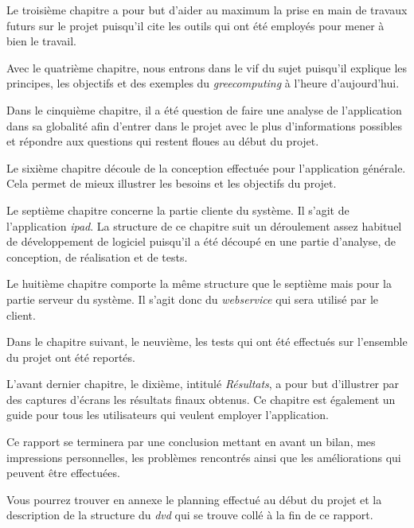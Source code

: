 \medskip

Le troisième chapitre a pour but d'aider au maximum la prise en main de travaux futurs sur le projet puisqu'il cite les outils qui ont été employés pour mener à bien le travail.

\medskip

Avec le quatrième chapitre, nous entrons dans le vif du sujet puisqu'il explique les principes, les objectifs et des exemples du \emph{\gls{greecomputing}} à l'heure d'aujourd'hui.

\medskip

Dans le cinquième chapitre, il a été question de faire une analyse de l'application dans sa globalité afin d'entrer dans le projet avec le plus d'informations possibles et répondre aux questions qui restent floues au début du projet. 

\medskip

Le sixième chapitre découle de la conception effectuée pour l'application générale. Cela permet de mieux illustrer les besoins et les objectifs du projet.

\medskip

Le septième chapitre concerne la partie cliente du système. Il s'agit de l'application \emph{\gls{ipad}}. La structure de ce chapitre suit un déroulement assez habituel de développement de logiciel puisqu'il a été découpé en une partie d'analyse, de conception, de réalisation et de tests.

\medskip

Le huitième chapitre comporte la même structure que le septième mais pour la partie serveur du système. Il s'agit donc du \emph{\gls{webservice}} qui sera utilisé par le client.

\medskip 

Dans le chapitre suivant, le neuvième, les tests qui ont été effectués sur l'ensemble du projet ont été reportés.

\medskip

L'avant dernier chapitre, le dixième, intitulé \emph{Résultats}, a pour but d'illustrer par des captures d'écrans les résultats finaux obtenus. Ce chapitre est également un guide pour tous les utilisateurs qui veulent employer l'application.

\medskip

Ce rapport se terminera par une conclusion mettant en avant un bilan, mes impressions personnelles, les problèmes rencontrés ainsi que les améliorations qui peuvent être effectuées.

\medskip

Vous pourrez trouver en annexe le planning effectué au début du projet et la description de la structure du \emph{\gls{dvd}} qui se trouve collé à la fin de ce rapport.

